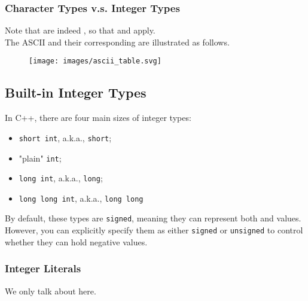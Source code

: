 \subsubsection*{Character Types v.s. Integer Types}
Note that {\color{blue}{character types}} are indeed {\color{blue}{integer types}}, so that {\color{blue}{arithmetic}} and {\color{blue}{bitwise logical operations}} apply. \\

The ASCII {\color{blue}{characters}} and their corresponding {\color{blue}{values}} are illustrated as follows.
\begin{figure}[H]
\centering
\texttt{[image: images/ascii\_table.svg]}
\label{fig:asciitable}
\end{figure}
\subsection{Built-in Integer Types}
In C++, there are four main sizes of integer types:
\begin{itemize}
\item {\colorbox{CodeBackground}{\lstinline|short int|}}, a.k.a., {\colorbox{CodeBackground}{\lstinline|short|}};
\item "plain" {\colorbox{CodeBackground}{\lstinline|int|}};
\item {\colorbox{CodeBackground}{\lstinline|long int|}}, a.k.a., {\colorbox{CodeBackground}{\lstinline|long|}};
\item {\colorbox{CodeBackground}{\lstinline|long long int|}}, a.k.a., {\colorbox{CodeBackground}{\lstinline|long long|}}
\end{itemize}
By default, these types are {\colorbox{CodeBackground}{\lstinline|signed|}}, meaning they can represent both {\color{blue}{positive}} and {\color{blue}{negative}} values. However, you can explicitly specify them as either {\colorbox{CodeBackground}{\lstinline|signed|}} or {\colorbox{CodeBackground}{\lstinline|unsigned|}} to control whether they can hold negative values.

\subsubsection*{Integer Literals}
We only talk about {\color{blue}{decimal integer literals}} here.

